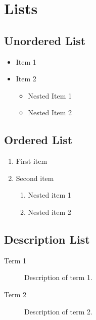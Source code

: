 \begingroup
\raggedright
\section{Lists}


\subsection{Unordered List}
\begin{itemize}
    \item Item 1
    \item Item 2
    \begin{itemize}
        \item Nested Item 1
        \item Nested Item 2
    \end{itemize}
\end{itemize}


\subsection{Ordered List}
\begin{enumerate}
    \item First item
    \item Second item
    \begin{enumerate}
        \item Nested item 1
        \item Nested item 2
    \end{enumerate}
\end{enumerate}


\subsection{Description List}
\begin{description}
    \item[Term 1] Description of term 1.
    \item[Term 2] Description of term 2.
\end{description}


\endgroup

